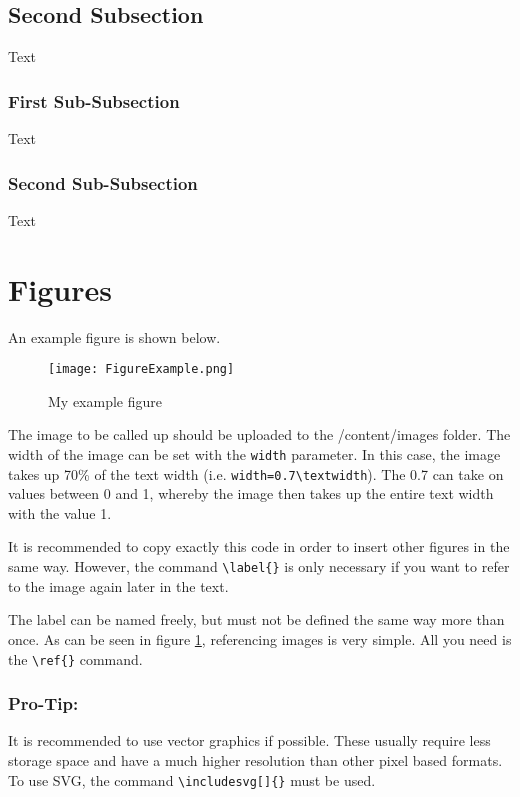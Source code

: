 \subsection{Second Subsection}
Text

\subsubsection{First Sub-Subsection}
Text

\subsubsection{Second Sub-Subsection}
Text


\section{Figures}
An example figure is shown below.

\begin{figure}[H]
    \centering
    \texttt{[image: FigureExample.png]}
    \caption{My example figure}
    \label{fig:example}
\end{figure}

The image to be called up should be uploaded to the /content/images folder. The width of the image can be set with the \texttt{width} parameter. In this case, the image takes up 70\% of the text width (i.e. \texttt{width=0.7\textbackslash{}textwidth}). The 0.7 can take on values between 0 and 1, whereby the image then takes up the entire text width with the value 1.

It is recommended to copy exactly this code in order to insert other figures in the same way. However, the command \texttt{\textbackslash{}label\{\}} is only necessary if you want to refer to the image again later in the text.

The label can be named freely, but must not be defined the same way more than once. As can be seen in figure \ref{fig:example}, referencing images is very simple. All you need is the \texttt{\textbackslash{}ref\{\}} command.

\subsubsection{Pro-Tip:}
It is recommended to use vector graphics if possible. These usually require less storage space and have a much higher resolution than other pixel based formats. To use SVG, the command \texttt{\textbackslash{}includesvg[]\{\}} must be used.

